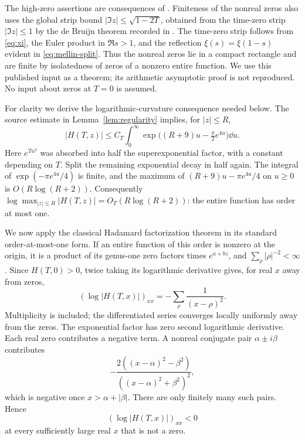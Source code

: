 The high-zero assertions are consequences of
\cite[Theorem 1.5(i)--(iii) and its multiplicity count in \S9]{Polymath}.
Finiteness of the nonreal zeros also uses the global strip bound
$|\Im z|\le\sqrt{1-2T}$, obtained from the time-zero strip
$|\Im z|\le1$ by the de Bruijn theorem recorded in
\cite[Theorem 3.2]{Polymath}. The time-zero strip follows from
\eqref{eq:xi}, the Euler product in $\Re s>1$, and the reflection
$\xi(s)=\xi(1-s)$ evident in \eqref{eq:mellin-split}.
Thus the nonreal zeros lie in a compact rectangle and are finite by
isolatedness of zeros of a nonzero entire function. We use this published
input as a theorem; its arithmetic asymptotic proof is not reproduced.
No input about zeros at $T=0$ is assumed.

For clarity we derive the logarithmic-curvature consequence needed below.
The source estimate in Lemma~\ref{lem:regularity} implies, for $|z|\le R$,
\[
 |H(T,z)|\le C_T\int_0^\infty
      \exp\bigl((R+9)u-\tfrac{\pi}{2}e^{4u}\bigr)\dd u .
\]
Here $e^{Tu^2}$ was absorbed into half the superexponential factor,
with a constant depending on $T$. Split the remaining exponential decay
in half again. The integral of $\exp(-\pi e^{4u}/4)$ is finite, and the
maximum of $(R+9)u-\pi e^{4u}/4$ on $u\ge0$ is $O(R\log(R+2))$.
Consequently $\log\max_{|z|\le R}|H(T,z)|=O_T(R\log(R+2))$:
the entire function has order at most one.

We now apply the classical Hadamard factorization theorem in its standard
order-at-most-one form. If an entire function of this order is nonzero
at the origin, it is a product of its genus-one zero factors times
$e^{a+bz}$, and $\sum_\rho|\rho|^{-2}<\infty$. Since $H(T,0)>0$,
twice taking its logarithmic derivative gives, for real $x$ away from
zeros,
\begin{equation}\label{eq:logH-zeros}
 (\log|H(T,x)|)_{xx}=-\sum_\rho\frac1{(x-\rho)^2}.
\end{equation}
Multiplicity is included; the differentiated series converges locally
uniformly away from the zeros. The exponential factor has zero second
logarithmic derivative. Each real zero contributes a negative term.
A nonreal conjugate pair $\alpha\pm i\beta$ contributes
\[
 -\frac{2((x-\alpha)^2-\beta^2)}
            {((x-\alpha)^2+\beta^2)^2},
\]
which is negative once $x>\alpha+|\beta|$. There are only finitely many
such pairs. Hence
\begin{equation}\label{eq:logH-negative}
 (\log|H(T,x)|)_{xx}<0
\end{equation}
at every sufficiently large real $x$ that is not a zero.

